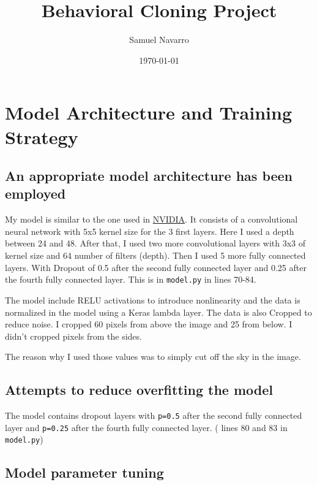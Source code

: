\documentclass[11pt, a4paper]{article}
\begin{document}
\title{Behavioral Cloning Project}
\author{Samuel Navarro}
\date{\today}
\maketitle
	
\tableofcontents{}


\section{Model Architecture and Training Strategy}%
\label{sec:model_architecture_and_training_strategy}

\subsection{An appropriate model architecture has been employed}%
\label{sub:an_appropriate_model_architecture_has_been_employed}


My model is similar to the one used in \href{http://images.nvidia.com/content/tegra/automotive/images/2016/solutions/pdf/end-to-end-dl-using-px.pdf}{NVIDIA}. It consists of a convolutional neural network with 5x5 kernel size for the 3 first layers. Here I used a depth between 24 and 48. After that, I used two more convolutional layers with 3x3 of kernel size and 64 number of filters (depth). Then I used 5 more fully connected layers. With Dropout of 0.5 after the second fully connected layer and 0.25 after the fourth fully connected layer. This is in \texttt{model.py} in lines 70-84.  

The model include RELU activations to introduce nonlinearity and the data is normalized in the model using a Keras lambda layer. The data is also Cropped to reduce noise. I cropped 60 pixels from above the image and 25 from below. I didn't cropped pixels from the sides. 

The reason why I used those values was to simply cut off the sky in the image.

\subsection{Attempts to reduce overfitting the model}%
\label{sub:attempts_to_reduce_overfitting_th_emodel}

The model contains dropout layers with \texttt{p=0.5}  after the second fully connected layer and \texttt{p=0.25} after the fourth fully connected layer. ( lines 80 and 83 in \texttt{model.py})  


\subsection{Model parameter tuning}%
\label{sub:model_parameter_tuning}
\end{document}
